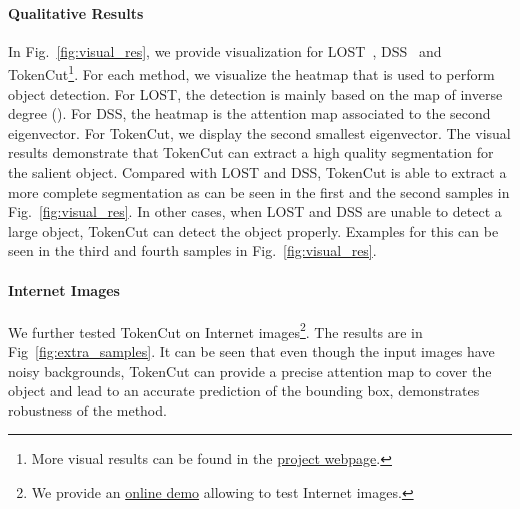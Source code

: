 \documentclass[twocolumn]{article}
\newcommand{\name} {TokenCut}
\begin{document}
\paragraph*{Qualitative Results}
 In Fig.~\ref{fig:visual_res}, we provide visualization for LOST~\cite{simeoni2021localizing}, DSS~\cite{melaskyriazi2022deep} and  {\name}\footnote{More visual results can be found in the \href{https://www.m-psi.fr/Papers/TokenCut2022/}{project webpage}.}. For each method, we visualize the heatmap that is used to perform object detection. For LOST, the detection is mainly based on the map of inverse degree (). For DSS, the heatmap is the attention map associated to the second eigenvector. For {\name}, we display the second smallest eigenvector.  The visual results demonstrate that  {\name} can extract a high quality segmentation for the salient object. Compared with LOST and DSS, {\name} is able to extract a more complete segmentation as can be seen in the first and the second samples in Fig.~\ref{fig:visual_res}. In other cases, when LOST and DSS are unable to detect a large object, {\name} can detect the object properly. Examples for this can be seen in the third and fourth samples in Fig.~\ref{fig:visual_res}. 

\paragraph*{Internet Images} We further tested {\name} on Internet images\footnote{We provide an \href{https://huggingface.co/spaces/yangtaowang/TokenCut}{online demo} allowing to test Internet images.}. The results are in Fig~\ref{fig:extra_samples}.  It can be seen that even though the input images have noisy backgrounds, {\name} can  provide a precise attention map to cover the object and lead to an accurate prediction of the bounding box, demonstrates robustness of the method.
\end{document}
